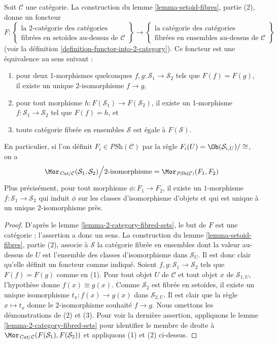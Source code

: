 \begin{lemma}
\label{lemma-2-category-fibred-setoids}
Soit $\mathcal{C}$ une catégorie. La construction du
lemme \ref{lemma-setoid-fibres},
partie (2), donne un foncteur
$$
F :
\left\{
\begin{matrix}
\text{la 2-catégorie des catégories}\\
\text{fibrées en setoïdes au-dessus de }\mathcal{C}
\end{matrix}
\right\}
\longrightarrow
\left\{
\begin{matrix}
\text{la catégorie des catégories}\\
\text{fibrées en ensembles au-dessus de }\mathcal{C}
\end{matrix}
\right\}
$$
(voir la
définition \ref{definition-functor-into-2-category}).
Ce foncteur est une équivalence au sens suivant :
\begin{enumerate}
\item pour deux 1-morphismes quelconques
$f, g : \mathcal{S}_1 \to \mathcal{S}_2$
tels que $F(f) = F(g)$, il existe un unique 2-isomorphisme $f \to g$,
\item pour tout morphisme $h : F(\mathcal{S}_1) \to F(\mathcal{S}_2)$,
il existe un 1-morphisme $f : \mathcal{S}_1 \to \mathcal{S}_2$
tel que $F(f) = h$, et
\item toute catégorie fibrée en ensembles $\mathcal{S}$ est égale à
$F(\mathcal{S})$.
\end{enumerate}
En particulier, si l'on définit $F_i \in \textit{PSh}(\mathcal{C})$ par la
règle $F_i(U) = \Ob(\mathcal{S}_{i, U})/\cong$, on a
$$
\Mor_{\textit{Cat}/\mathcal{C}}(\mathcal{S}_1, \mathcal{S}_2)
\Big/
2\text{-isomorphisme}
=
\Mor_{\textit{PSh}(\mathcal{C})}(F_1, F_2)
$$
Plus précisément, pour tout morphisme $\phi : F_1 \to F_2$, il existe un
$1$-morphisme $f : \mathcal{S}_1 \to \mathcal{S}_2$ qui induit
$\phi$ sur les classes d'isomorphisme d'objets et
qui est unique à un unique $2$-isomorphisme près.
\end{lemma}

\begin{proof}
D'après le
lemme \ref{lemma-2-category-fibred-sets},
le but de $F$ est une catégorie ; l'assertion a donc un sens.
La construction du
lemme \ref{lemma-setoid-fibres}, partie (2),
associe à $\mathcal{S}$ la catégorie fibrée en ensembles dont la valeur au-dessus
de $U$ est l'ensemble des classes d'isomorphisme dans $\mathcal{S}_U$. Il est
donc clair qu'elle définit un foncteur comme indiqué.
Soient $f, g : \mathcal{S}_1 \to \mathcal{S}_2$
tels que $F(f) = F(g)$ comme en (1). Pour tout objet $U$ de $\mathcal{C}$
et tout objet $x$ de $\mathcal{S}_{1, U}$, l'hypothèse donne
$f(x) \cong g(x)$. Comme $\mathcal{S}_2$ est fibrée en setoïdes,
il existe un unique isomorphisme $t_x : f(x) \to g(x)$ dans
$\mathcal{S}_{2, U}$.
Il est clair que la règle $x \mapsto t_x$ donne le $2$-isomorphisme souhaité
$f \to g$. Nous omettons les démonstrations de (2) et (3).
Pour voir la dernière assertion, appliquons le
lemme \ref{lemma-2-category-fibred-sets}
pour identifier le membre de droite à
$\Mor_{\textit{Cat}/\mathcal{C}}(F(\mathcal{S}_1), F(\mathcal{S}_2))$
et appliquons (1) et (2) ci-dessus.
\end{proof}


